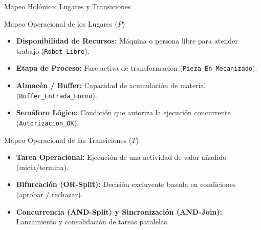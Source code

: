 \documentclass[10pt, aspectratio=169]{beamer}
\begin{document}
\begin{frame}{Mapeo Holónico: Lugares y Transiciones}
	\begin{block}{Mapeo Operacional de los Lugares ($P$)}
		\begin{itemize}
			\item \textbf{Disponibilidad de Recursos:} Máquina o persona libre para atender trabajo (\texttt{Robot\_Libre}).
			\item \textbf{Etapa de Proceso:} Fase activa de transformación (\texttt{Pieza\_En\_Mecanizado}).
			\item \textbf{Almacén / Buffer:} Capacidad de acumulación de material (\texttt{Buffer\_Entrada\_Horno}).
			\item \textbf{Semáforo Lógico:} Condición que autoriza la ejecución concurrente (\texttt{Autorizacion\_OK}).
		\end{itemize}
	\end{block}

	\begin{block}{Mapeo Operacional de las Transiciones ($T$)}
		\begin{itemize}
			\item \textbf{Tarea Operacional:} Ejecución de una actividad de valor añadido (inicia/termina).
			\item \textbf{Bifurcación (OR-Split):} Decisión excluyente basada en condiciones (aprobar / rechazar).
			\item \textbf{Concurrencia (AND-Split) y Sincronización (AND-Join):} Lanzamiento y consolidación de tareas paralelas.
		\end{itemize}
	\end{block}
\end{frame}
\end{document}
